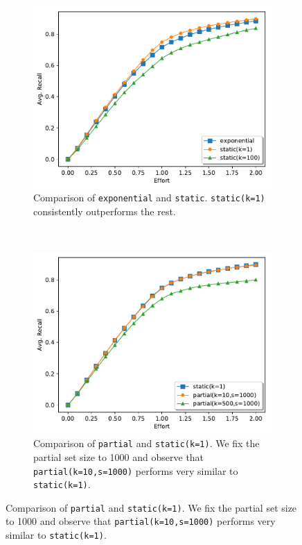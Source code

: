 \begin{figure}
    \centering
    \begin{subfigure}[t]{0.48\textwidth}
        \centering
        \includegraphics[width=\textwidth]{plots/bmi_static.pdf}
        \caption{Comparison of \texttt{exponential} and \texttt{static}.
            \texttt{static(k=1)} consistently outperforms the rest.}
        \label{plot:bmi_static}
    \end{subfigure}
    ~
    \begin{subfigure}[t]{0.48\textwidth}
        \centering
        \includegraphics[width=\textwidth]{plots/static_partial.pdf}
        \caption{Comparison of \texttt{partial} and \texttt{static(k=1)}. We fix
            the partial set size to 1000 and observe that
            \texttt{partial(k=10,s=1000)} performs very similar to
        \texttt{static(k=1)}.}
        \label{plot:partial1}
    \end{subfigure}


\end{figure}

